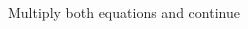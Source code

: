 \documentclass[12pt, a4paper, addpoints]{exam}
\newcommand{\elimination}[6]{%
    \pgfmathsetmacro{\cval}{#3*#1 + #5*#2} %
    \pgfmathsetmacro{\pval}{#4*#1 + #6*#2} %

    \def\formata{%
        \ifnum#3=1
            x
        \else\ifnum#3=-1
            -x
        \else
            \pgfmathprintnumber{#3}x
        \fi\fi}

    \def\formatb{%
        \ifnum#5=1
            +y
        \else\ifnum#5=-1
            -y
        \else
            \ifnum#5<0 \pgfmathprintnumber{#5}y \else +\pgfmathprintnumber{#5}y \fi
        \fi\fi}

    \def\formatd{%
        \ifnum#4=1
            x
        \else\ifnum#4=-1
            -x
        \else
            \pgfmathprintnumber{#4}x
        \fi\fi}

    \def\formate{%
        \ifnum#6=1
            +y
        \else\ifnum#6=-1
            -y
        \else
            \ifnum#6<0 \pgfmathprintnumber{#6}y \else +\pgfmathprintnumber{#6}y \fi
        \fi\fi}

    \[
    \begin{aligned}
    \formata \formatb &= \pgfmathprintnumber{\cval} \\[-1pt]
    \formatd \formate &= \pgfmathprintnumber{\pval}
    \end{aligned}
    \]
}
\begin{document}
\begin{questions}
\begin{multicols}{2}
\end{multicols}

\question Multiply both equations and continue
\begin{multicols}{2} %
\end{multicols}
\end{questions}
\end{document}
